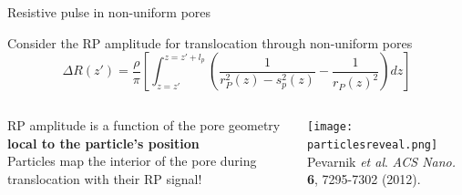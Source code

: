 \begin{frame}[c]{Resistive pulse in non-uniform pores}

	{\small Consider the RP amplitude for translocation through non-uniform pores} \\
	{\small
		$$ \Delta R\left(z'\right)=\frac{\rho}{\pi}\left[\int_{z=z'}^{z=z'+l_{p}}\left(\frac{1}{r_{P}^{2}\left(z\right)-s_{p}^{2}\left(z\right)}-\frac{1}{r_{P}\left(z\right)^{2}}\right)dz\right] $$
	}
	
	\vspace{.1in}
	
	\begin{columns}[t]
		\begin{column}[T]{2.5in}
			{\small
				RP amplitude is a function of the pore geometry \textbf{local to the particle's position} \\
				\vspace{.2in}
				Particles map the interior of the pore during translocation with their RP signal! \\
			}
		\end{column}
		
		\begin{column}[T]{2in}
			{\centering
				\texttt{[image: particlesreveal.png]} \\
				{\tiny Pevarnik \textit{et al}. \textit{ACS Nano.} \textbf{6}, 7295-7302 (2012).} \\
				\par
			}
		\end{column}
	\end{columns}

	
	
	
	

	
\end{frame}



